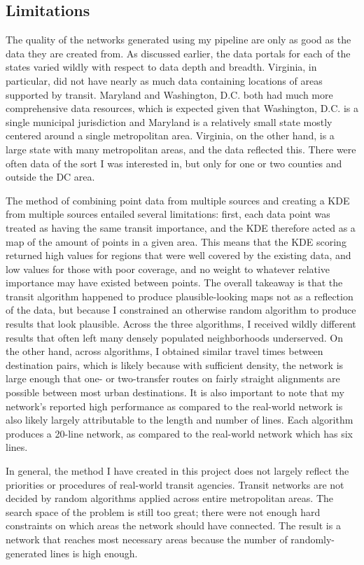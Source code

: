 \documentclass[sigconf,nonacm]{acmart}
\begin{document}
\subsection{Limitations}
The quality of the networks generated using my pipeline are only as good as the data they are created from. As discussed earlier, the data portals for each of the states varied wildly with respect to data depth and breadth. Virginia, in particular, did not have nearly as much data containing locations of areas supported by transit. Maryland and Washington, D.C. both had much more comprehensive data resources, which is expected given that Washington, D.C. is a single municipal jurisdiction and Maryland is a relatively small state mostly centered around a single metropolitan area. Virginia, on the other hand, is a large state with many metropolitan areas, and the data reflected this. There were often data of the sort I was interested in, but only for one or two counties and outside the DC area. 

The method of combining point data from multiple sources and creating a KDE from multiple sources entailed several limitations: first, each data point was treated as having the same transit importance, and the KDE therefore acted as a map of the amount of points in a given area. This means that the KDE scoring returned high values for regions that were well covered by the existing data, and low values for those with poor coverage, and no weight to whatever relative importance may have existed between points. The overall takeaway is that the transit algorithm happened to produce plausible-looking maps not as a reflection of the data, but because I constrained an otherwise random algorithm to produce results that look plausible. Across the three algorithms, I received wildly different results that often left many densely populated neighborhoods underserved. On the other hand, across algorithms, I obtained similar travel times between destination pairs, which is likely because with sufficient density, the network is large enough that one- or two-transfer routes on fairly straight alignments are possible between most urban destinations. It is also important to note that my network's reported high performance as compared to the real-world network is also likely largely attributable to the length and number of lines. Each algorithm produces a 20-line network, as compared to the real-world network which has six lines. 

In general, the method I have created in this project does not largely reflect the priorities or procedures of real-world transit agencies. Transit networks are not decided by random algorithms applied across entire metropolitan areas. The search space of the problem is still too great; there were not enough hard constraints on which areas the network should have connected. The result is a network that reaches most necessary areas because the number of randomly-generated lines is high enough. 
\end{document}
